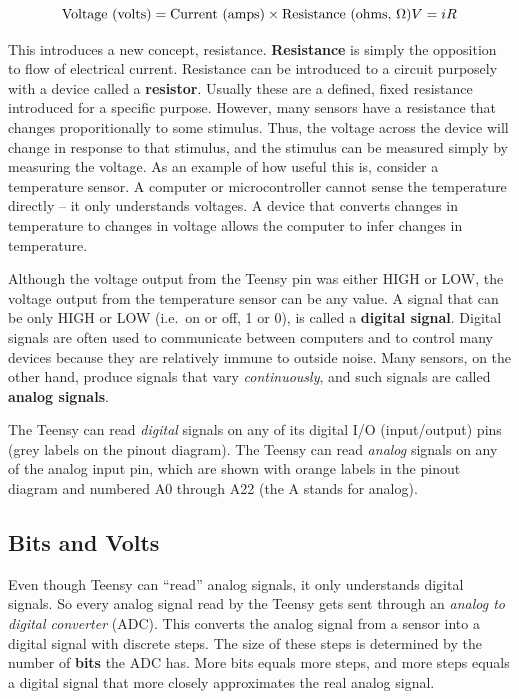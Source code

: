 \documentclass[]{book}
\begin{document}
\[
\text{Voltage (volts)} = \text{Current (amps)} \times \text{Resistance (ohms, }\Omega\text{)}  \\
V = iR
\]

This introduces a new concept, resistance. \textbf{Resistance} is simply the opposition to flow of electrical current. Resistance can be introduced to a circuit purposely with a device called a \textbf{resistor}. Usually these are a defined, fixed resistance introduced for a specific purpose. However, many sensors have a resistance that changes proporitionally to some stimulus. Thus, the voltage across the device will change in response to that stimulus, and the stimulus can be measured simply by measuring the voltage. As an example of how useful this is, consider a temperature sensor. A computer or microcontroller cannot sense the temperature directly -- it only understands voltages. A device that converts changes in temperature to changes in voltage allows the computer to infer changes in temperature.

Although the voltage output from the Teensy pin was either HIGH or LOW, the voltage output from the temperature sensor can be any value. A signal that can be only HIGH or LOW (i.e.~on or off, 1 or 0), is called a \textbf{digital signal}. Digital signals are often used to communicate between computers and to control many devices because they are relatively immune to outside noise. Many sensors, on the other hand, produce signals that vary \emph{continuously}, and such signals are called \textbf{analog signals}.

The Teensy can read \emph{digital} signals on any of its digital I/O (input/output) pins (grey labels on the pinout diagram). The Teensy can read \emph{analog} signals on any of the analog input pin, which are shown with orange labels in the pinout diagram and numbered A0 through A22 (the A stands for analog).

\hypertarget{bits-and-volts}{%
\subsection*{Bits and Volts}\label{bits-and-volts}}

Even though Teensy can ``read'' analog signals, it only understands digital signals. So every analog signal read by the Teensy gets sent through an \emph{analog to digital converter} (ADC). This converts the analog signal from a sensor into a digital signal with discrete steps. The size of these steps is determined by the number of \textbf{bits} the ADC has. More bits equals more steps, and more steps equals a digital signal that more closely approximates the real analog signal.
\end{document}
